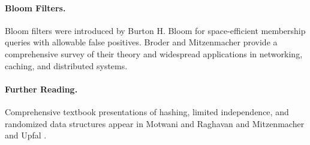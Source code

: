 \paragraph*{Bloom Filters.}
Bloom filters were introduced by Burton H. Bloom \cite{b-stteh-70} for space-efficient membership queries with allowable false positives. Broder and Mitzenmacher \cite{bm-nawnf-04} provide a comprehensive survey of their theory and widespread applications in networking, caching, and distributed systems. 

\paragraph*{Further Reading.}
Comprehensive textbook presentations of hashing, limited independence, and randomized data structures appear in Motwani and Raghavan \cite[Chapters~3 and 8]{mr-ra-95} and Mitzenmacher and Upfal \cite[Chapters~3, 5, and 15]{mu-pcra-17}.


\ChapterEnd{}

